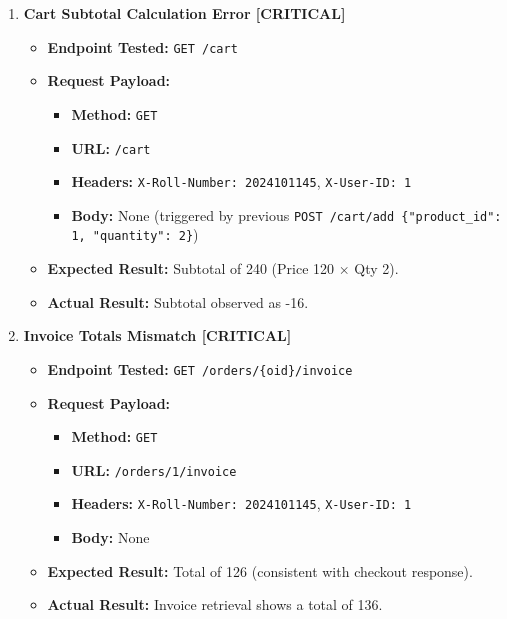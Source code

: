 \documentclass{article}
\begin{document}
\begin{enumerate}
    \item \textbf{Cart Subtotal Calculation Error [CRITICAL]}
    \begin{itemize}
        \item \textbf{Endpoint Tested:} \texttt{GET /cart}
        \item \textbf{Request Payload:} 
        \begin{itemize}
            \item \textbf{Method:} \texttt{GET}
            \item \textbf{URL:} \texttt{/cart}
            \item \textbf{Headers:} \texttt{X-Roll-Number: 2024101145}, \texttt{X-User-ID: 1}
            \item \textbf{Body:} None (triggered by previous \texttt{POST /cart/add \{"product_id": 1, "quantity": 2\}})
        \end{itemize}
        \item \textbf{Expected Result:} Subtotal of 240 (Price 120 $\times$ Qty 2).
        \item \textbf{Actual Result:} Subtotal observed as -16.
    \end{itemize}

    \item \textbf{Invoice Totals Mismatch [CRITICAL]}
    \begin{itemize}
        \item \textbf{Endpoint Tested:} \texttt{GET /orders/\{oid\}/invoice}
        \item \textbf{Request Payload:} 
        \begin{itemize}
            \item \textbf{Method:} \texttt{GET}
            \item \textbf{URL:} \texttt{/orders/1/invoice}
            \item \textbf{Headers:} \texttt{X-Roll-Number: 2024101145}, \texttt{X-User-ID: 1}
            \item \textbf{Body:} None
        \end{itemize}
        \item \textbf{Expected Result:} Total of 126 (consistent with checkout response).
        \item \textbf{Actual Result:} Invoice retrieval shows a total of 136.
    \end{itemize}


\end{enumerate}
\end{document}
